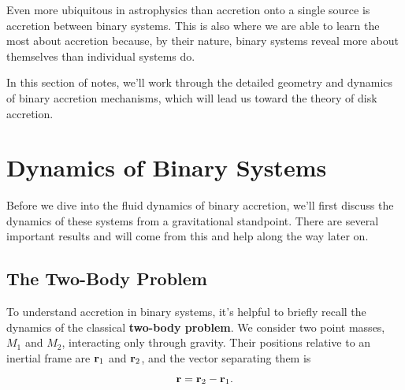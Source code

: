 Even more ubiquitous in astrophysics than accretion onto a single source is accretion between binary systems. This is also where we are able to learn the most about accretion because, by their nature, binary systems reveal more about themselves than individual systems do.
\par
In this section of notes, we'll work through the detailed geometry and dynamics of binary accretion mechanisms, which will lead us toward the theory of disk accretion.

\section{Dynamics of Binary Systems}

Before we dive into the fluid dynamics of binary accretion, we'll first discuss the dynamics of these systems from a gravitational standpoint. There are several important results and will come from this and help along the way later on.

\subsection{The Two-Body Problem}
To understand accretion in binary systems, it’s helpful to briefly recall the dynamics of the classical \textbf{two-body problem}.  We consider two point masses, $M_1$ and $M_2$, interacting only through gravity. Their positions relative to an inertial frame are ${\bf r}_1$ and ${\bf r}_2$, and the vector separating them is  
\[
{\bf r} = {\bf r}_2 - {\bf r}_1.
\]

